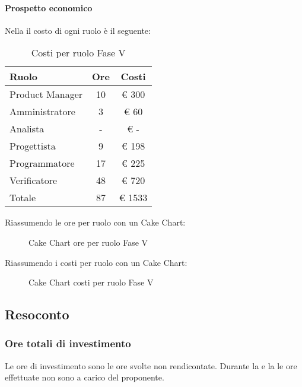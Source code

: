 			\paragraph{Prospetto economico}
				Nella  il costo di ogni ruolo è il seguente:
				\begin{table}
					\begin{center}
						\begin{tabular}{| l | c | c |}
							\hline
							Ruolo 				& Ore 		& Costi  \\ \hline
							
							Product Manager		& 10 		& \euro{} 300 	\\
							Amministratore 		& 3 		& \euro{} 60 	\\
							Analista	 		& - 		& \euro{} - 	\\
							Progettista 		& 9 		& \euro{} 198  	\\
							Programmatore		& 17 		& \euro{} 225 	\\
							Verificatore		& 48 		& \euro{} 720 	\\ \hline \hline
							
							Totale	 			& 87 		& \euro{} 1533 	\\ \hline
						\end{tabular}
					\end{center}
					\caption{Costi per ruolo Fase V}
				\end{table}
				Riassumendo le ore per ruolo con un Cake Chart:
				\begin{figure}\centering
					\caption{Cake Chart ore per ruolo Fase V}
				\end{figure}
				Riassumendo i costi per ruolo con un Cake Chart:
				\begin{figure}\centering
					\caption{Cake Chart costi per ruolo Fase V}
				\end{figure}
	\subsection{Resoconto}
		\subsubsection{Ore totali di investimento}
		Le ore di investimento sono le ore svolte non rendicontate. Durante la  e la  le ore effettuate non sono a carico del proponente.
